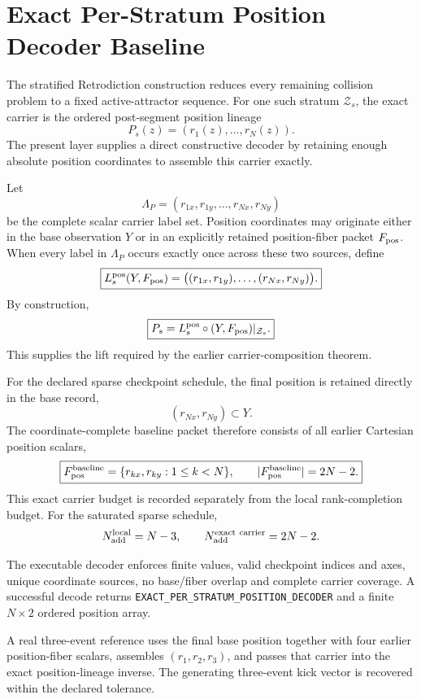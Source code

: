 \chapter{Exact Per-Stratum Position Decoder Baseline}
\label{chap:per-stratum-position-decoder}

The stratified Retrodiction construction reduces every remaining collision problem to a fixed active-attractor sequence. For one such stratum $\mathcal Z_s$, the exact carrier is the ordered post-segment position lineage
\[
P_s(z)=(r_1(z),\ldots,r_N(z)).
\]
The present layer supplies a direct constructive decoder by retaining enough absolute position coordinates to assemble this carrier exactly.

Let
\[
\Lambda_P=(r_{1x},r_{1y},\ldots,r_{Nx},r_{Ny})
\]
be the complete scalar carrier label set. Position coordinates may originate either in the base observation $Y$ or in an explicitly retained position-fiber packet $F_{\rm pos}$. When every label in $\Lambda_P$ occurs exactly once across these two sources, define
\[
\boxed{
L_s^{\rm pos}(Y,F_{\rm pos})
=\bigl((r_{1x},r_{1y}),\ldots,(r_{Nx},r_{Ny})\bigr).
}
\]
By construction,
\[
\boxed{
P_s=L_s^{\rm pos}\circ(Y,F_{\rm pos})|_{\mathcal Z_s}.
}
\]
This supplies the lift required by the earlier carrier-composition theorem.

For the declared sparse checkpoint schedule, the final position is retained directly in the base record,
\[
(r_{Nx},r_{Ny})\subset Y.
\]
The coordinate-complete baseline packet therefore consists of all earlier Cartesian position scalars,
\[
\boxed{
F_{\rm pos}^{\rm baseline}=\{r_{kx},r_{ky}:1\le k<N\},
\qquad
|F_{\rm pos}^{\rm baseline}|=2N-2.
}
\]
This exact carrier budget is recorded separately from the local rank-completion budget. For the saturated sparse schedule,
\[
N_{\rm add}^{\rm local}=N-3,
\qquad
N_{\rm add}^{\rm exact\ carrier}=2N-2.
\]

The executable decoder enforces finite values, valid checkpoint indices and axes, unique coordinate sources, no base/fiber overlap and complete carrier coverage. A successful decode returns \texttt{EXACT\_PER\_STRATUM\_POSITION\_DECODER} and a finite $N\times2$ ordered position array.

A real three-event reference uses the final base position together with four earlier position-fiber scalars, assembles $(r_1,r_2,r_3)$, and passes that carrier into the exact position-lineage inverse. The generating three-event kick vector is recovered within the declared tolerance.


